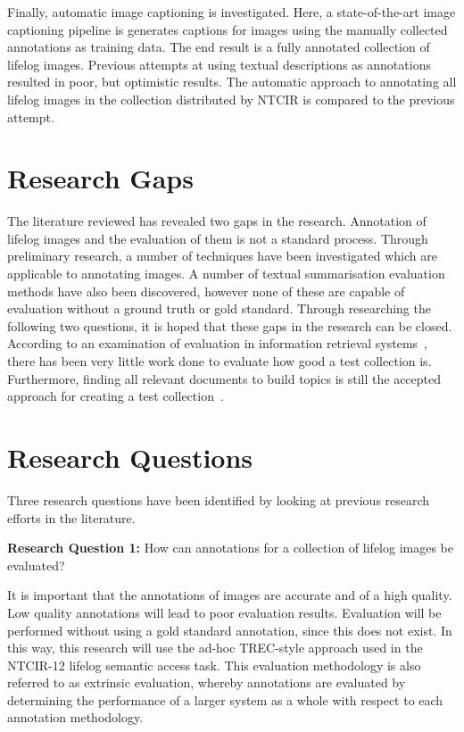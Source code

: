 Finally, automatic image captioning is investigated. Here, a state-of-the-art image captioning pipeline is generates captions for images using the manually collected annotations as training data. The end result is a fully annotated collection of lifelog images. Previous attempts at using textual descriptions as annotations~\cite{scells2016qut} resulted in poor, but optimistic results. The automatic approach to annotating all lifelog images in the collection distributed by NTCIR is compared to the previous attempt.

\section{Research Gaps}

The literature reviewed has revealed two gaps in the research. Annotation of lifelog images and the evaluation of them is not a standard process. Through preliminary research, a number of techniques have been investigated which are applicable to annotating images. A number of textual summarisation evaluation methods have also been discovered, however none of these are capable of evaluation without a ground truth or gold standard. Through researching the following two questions, it is hoped that these gaps in the research can be closed. According to an examination of evaluation in information retrieval systems~\cite[p. 24]{sanderson2010test}, there has been very little work done to evaluate how good a test collection is. Furthermore, finding all relevant documents to build topics is still the accepted approach for creating a test collection~\cite{cooper1973selecting}.

\section{Research Questions}

Three research questions have been identified by looking at previous research efforts in the literature. 

\textbf{Research Question 1:} How can annotations for a collection of lifelog images be evaluated?

It is important that the annotations of images are accurate and of a high quality. Low quality annotations will lead to poor evaluation results. Evaluation will be performed without using a gold standard annotation, since this does not exist. In this way, this research will use the ad-hoc TREC-style approach used in the NTCIR-12 lifelog semantic access task. This evaluation methodology is also referred to as extrinsic evaluation, whereby annotations are evaluated by determining the performance of a larger system as a whole with respect to each annotation methodology.

